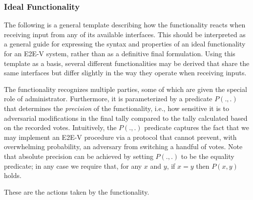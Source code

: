 \subsubsection{Ideal Functionality}

The following is a general template describing how the functionality
reacts when receiving input from any of its available interfaces. This
should be interpreted as a general guide for expressing the syntax and
properties of an ideal functionality for an E2E-V system, rather than
as a definitive final formulation. Using this template as a basis,
several different functionalities may be derived that share the same
interfaces but differ slightly in the way they operate when receiving
inputs.

The functionality recognizes multiple parties, some of which are
given the special role of administrator. Furthermore, it is
parameterized by a predicate $P(.,.)$ that determines the
\emph{precision} of the functionality, i.e., how sensitive it is to
adversarial modifications in the final tally compared to the tally
calculated based on the recorded votes. Intuitively, the $P(.,.)$
predicate captures the fact that we may implement an E2E-V procedure
via a protocol that cannot prevent, with overwhelming probability, an
adversary from switching a handful of votes. Note that absolute
precision can be achieved by setting $P(.,.)$ to be the equality
predicate; in any case we require that, for any $x$ and $y$, if $x=y$
then $P(x,y)$ holds.

These are the actions taken by the functionality.

